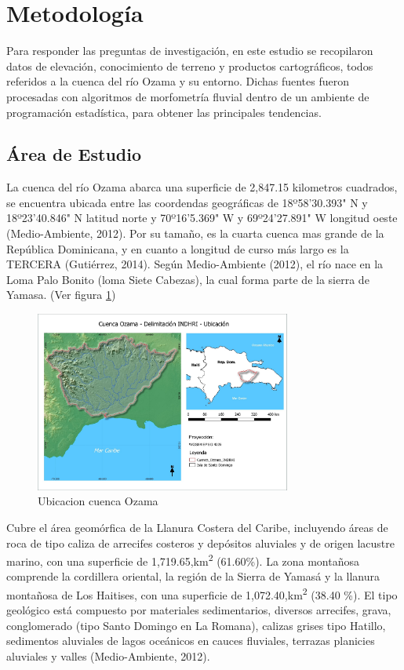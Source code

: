 \documentclass[11pt,]{article}
\begin{document}
\section{Metodología}\label{metodologuxeda}

Para responder las preguntas de investigación, en este estudio se
recopilaron datos de elevación, conocimiento de terreno y productos
cartográficos, todos referidos a la cuenca del río Ozama y su entorno.
Dichas fuentes fueron procesadas con algoritmos de morfometría fluvial
dentro de un ambiente de programación estadística, para obtener las
principales tendencias.

\subsection{Área de Estudio}\label{uxe1rea-de-estudio}

La cuenca del río Ozama abarca una superficie de 2,847.15 kilometros
cuadrados, se encuentra ubicada entre las coordendas geográficas de
18º58'30.393" N y 18º23'40.846" N latitud norte y 70º16'5.369" W y
69º24'27.891" W longitud oeste (Medio-Ambiente, 2012). Por su tamaño, es
la cuarta cuenca mas grande de la República Dominicana, y en cuanto a
longitud de curso más largo es la TERCERA (Gutiérrez, 2014). Según
Medio-Ambiente (2012), el río nace en la Loma Palo Bonito (loma Siete
Cabezas), la cual forma parte de la sierra de Yamasa. (Ver figura
\ref{fig:ubi-indrhi})

\begin{figure}
\centering
\includegraphics[width=0.75000\textwidth]{Productos Generados/Mapa Final_page-0001.jpg}
\caption{\label{fig:ubi-indrhi}Ubicacion cuenca Ozama}
\end{figure}

Cubre el área geomórfica de la Llanura Costera del Caribe, incluyendo
áreas de roca de tipo caliza de arrecifes costeros y depósitos aluviales
y de origen lacustre marino, con una superficie de
1,719.65,km\textsuperscript{2} (61.60\%). La zona montañosa comprende la
cordillera oriental, la región de la Sierra de Yamasá y la llanura
montañosa de Los Haitises, con una superficie de
1,072.40,km\textsuperscript{2} (38.40 \%). El tipo geológico está
compuesto por materiales sedimentarios, diversos arrecifes, grava,
conglomerado (tipo Santo Domingo en La Romana), calizas grises tipo
Hatillo, sedimentos aluviales de lagos oceánicos en cauces fluviales,
terrazas planicies aluviales y valles (Medio-Ambiente, 2012).
\end{document}
